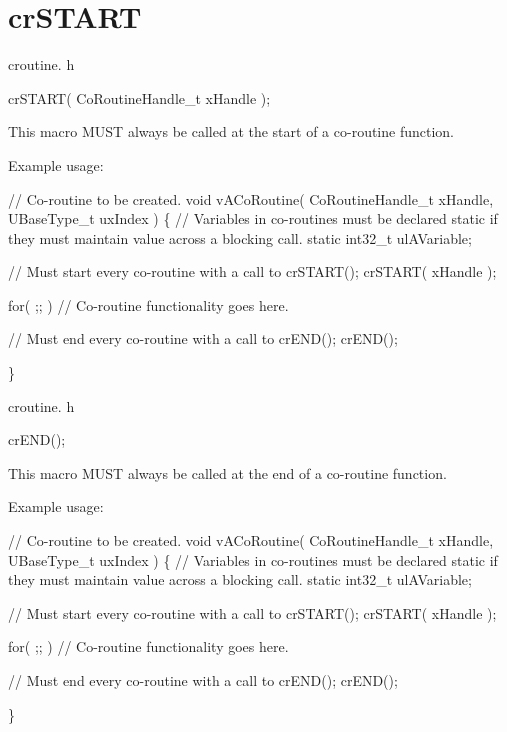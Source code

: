 \hypertarget{group__crSTART}{}\section{cr\+S\+T\+A\+RT}
\label{group__crSTART}
croutine. h 
\begin{DoxyPre}
crSTART( CoRoutineHandle\_t xHandle );\end{DoxyPre}


This macro M\+U\+ST always be called at the start of a co-\/routine function.

Example usage\+: 
\begin{DoxyPre}
// Co-routine to be created.
void vACoRoutine( CoRoutineHandle\_t xHandle, UBaseType\_t uxIndex )
\{
// Variables in co-routines must be declared static if they must maintain value across a blocking call.
static int32\_t ulAVariable;
\begin{DoxyVerb}// Must start every co-routine with a call to crSTART();
crSTART( xHandle );

for( ;; )
{
     // Co-routine functionality goes here.
}

// Must end every co-routine with a call to crEND();
crEND();
\end{DoxyVerb}

\}\end{DoxyPre}


croutine. h 
\begin{DoxyPre}
crEND();\end{DoxyPre}


This macro M\+U\+ST always be called at the end of a co-\/routine function.

Example usage\+: 
\begin{DoxyPre}
// Co-routine to be created.
void vACoRoutine( CoRoutineHandle\_t xHandle, UBaseType\_t uxIndex )
\{
// Variables in co-routines must be declared static if they must maintain value across a blocking call.
static int32\_t ulAVariable;
\begin{DoxyVerb}// Must start every co-routine with a call to crSTART();
crSTART( xHandle );

for( ;; )
{
     // Co-routine functionality goes here.
}

// Must end every co-routine with a call to crEND();
crEND();
\end{DoxyVerb}

\}\end{DoxyPre}
 